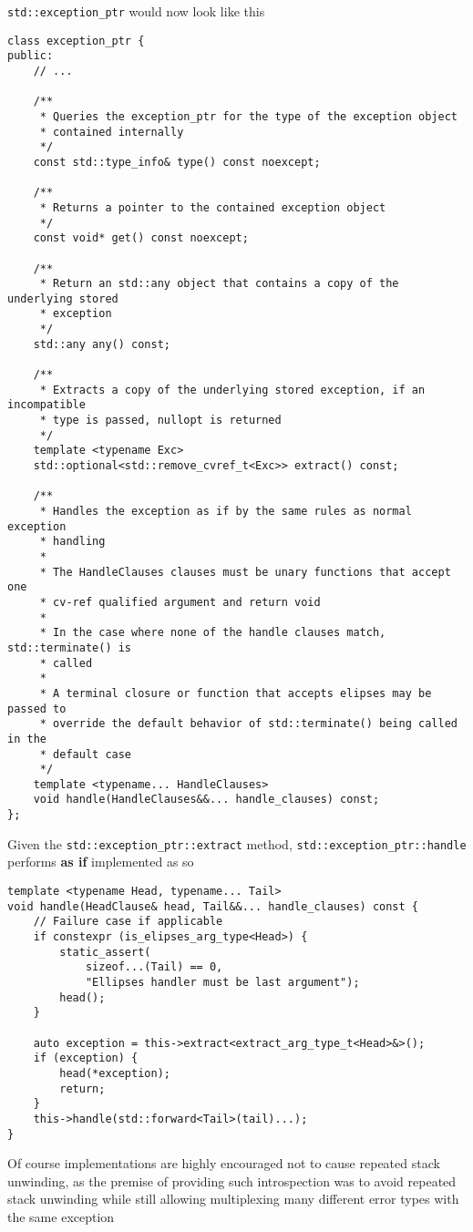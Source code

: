\documentclass{article}
\begin{document}
\texttt{std::exception\_ptr} would now look like this
\begin{lstlisting}
class exception_ptr {
public:
    // ...

    /**
     * Queries the exception_ptr for the type of the exception object
     * contained internally
     */
    const std::type_info& type() const noexcept;

    /**
     * Returns a pointer to the contained exception object
     */
    const void* get() const noexcept;

    /**
     * Return an std::any object that contains a copy of the underlying stored
     * exception
     */
    std::any any() const;

    /**
     * Extracts a copy of the underlying stored exception, if an incompatible
     * type is passed, nullopt is returned
     */
    template <typename Exc>
    std::optional<std::remove_cvref_t<Exc>> extract() const;

    /**
     * Handles the exception as if by the same rules as normal exception
     * handling
     *
     * The HandleClauses clauses must be unary functions that accept one
     * cv-ref qualified argument and return void
     *
     * In the case where none of the handle clauses match, std::terminate() is
     * called
     *
     * A terminal closure or function that accepts elipses may be passed to
     * override the default behavior of std::terminate() being called in the
     * default case
     */
    template <typename... HandleClauses>
    void handle(HandleClauses&&... handle_clauses) const;
};
\end{lstlisting}

Given the \texttt{std::exception\_ptr::extract} method,
\texttt{std::exception\_ptr::handle} performs \textbf{as if} implemented as so
\begin{lstlisting}
template <typename Head, typename... Tail>
void handle(HeadClause& head, Tail&&... handle_clauses) const {
    // Failure case if applicable
    if constexpr (is_elipses_arg_type<Head>) {
        static_assert(
            sizeof...(Tail) == 0,
            "Ellipses handler must be last argument");
        head();
    }

    auto exception = this->extract<extract_arg_type_t<Head>&>();
    if (exception) {
        head(*exception);
        return;
    }
    this->handle(std::forward<Tail>(tail)...);
}
\end{lstlisting}

Of course implementations are highly encouraged not to cause repeated stack
unwinding, as the premise of providing such introspection was to avoid
repeated stack unwinding while still allowing multiplexing many different
error types with the same exception
\end{document}
